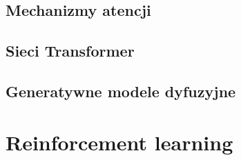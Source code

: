 \documentclass{myclass}
\begin{document}
\subsection{Mechanizmy atencji}



\subsection{Sieci Transformer}



\subsection{Generatywne modele dyfuzyjne}



\section{Reinforcement learning}
\end{document}
